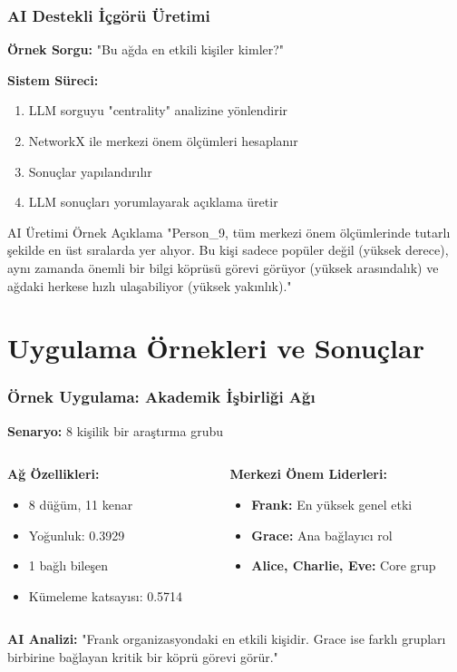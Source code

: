 \documentclass[aspectratio=169]{beamer}
\begin{document}
\begin{frame}
\frametitle{AI Destekli İçgörü Üretimi}
\textbf{Örnek Sorgu:} "Bu ağda en etkili kişiler kimler?"

\vspace{0.3cm}
\textbf{Sistem Süreci:}
\begin{enumerate}
    \item LLM sorguyu "centrality" analizine yönlendirir
    \item NetworkX ile merkezi önem ölçümleri hesaplanır
    \item Sonuçlar yapılandırılır
    \item LLM sonuçları yorumlayarak açıklama üretir
\end{enumerate}

\vspace{0.3cm}
\begin{block}{AI Üretimi Örnek Açıklama}
"Person\_9, tüm merkezi önem ölçümlerinde tutarlı şekilde en üst sıralarda yer alıyor. Bu kişi sadece popüler değil (yüksek derece), aynı zamanda önemli bir bilgi köprüsü görevi görüyor (yüksek arasındalık) ve ağdaki herkese hızlı ulaşabiliyor (yüksek yakınlık)."
\end{block}
\end{frame}

\section{Uygulama Örnekleri ve Sonuçlar}

\begin{frame}
\frametitle{Örnek Uygulama: Akademik İşbirliği Ağı}
\textbf{Senaryo:} 8 kişilik bir araştırma grubu

\vspace{0.3cm}
\begin{columns}
\begin{column}{0.5\textwidth}
\textbf{Ağ Özellikleri:}
\begin{itemize}
    \item 8 düğüm, 11 kenar
    \item Yoğunluk: 0.3929
    \item 1 bağlı bileşen
    \item Kümeleme katsayısı: 0.5714
\end{itemize}
\end{column}
\begin{column}{0.5\textwidth}
\textbf{Merkezi Önem Liderleri:}
\begin{itemize}
    \item \textbf{Frank:} En yüksek genel etki
    \item \textbf{Grace:} Ana bağlayıcı rol
    \item \textbf{Alice, Charlie, Eve:} Core grup
\end{itemize}
\end{column}
\end{columns}

\vspace{0.3cm}
\textbf{AI Analizi:} "Frank organizasyondaki en etkili kişidir. Grace ise farklı grupları birbirine bağlayan kritik bir köprü görevi görür."
\end{frame}
\end{document}

